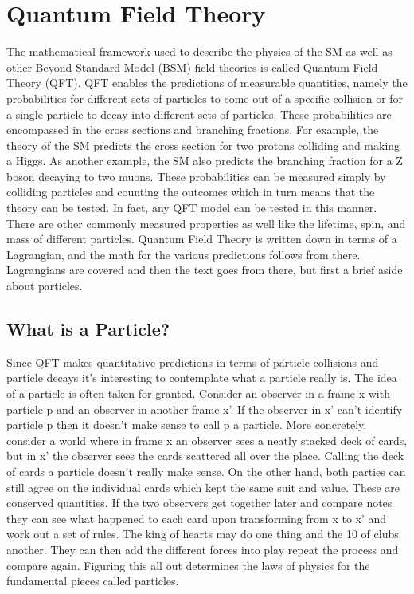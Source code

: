 
\section{Quantum Field Theory}


The mathematical framework used to describe the physics of the SM as well as other Beyond Standard Model (BSM) field theories is called Quantum Field Theory (QFT). QFT enables the predictions of measurable quantities, namely the probabilities for different sets of particles to come out of a specific collision or for a single particle to decay into different sets of particles. These probabilities are encompassed in the cross sections and branching fractions. For example, the theory of the SM predicts the cross section for two protons colliding and making a Higgs. As another example, the SM also predicts the branching fraction for a Z boson decaying to two muons. These probabilities can be measured simply by colliding particles and counting the outcomes which in turn means that the theory can be tested. In fact, any QFT model can be tested in this manner. There are other commonly measured properties as well like the lifetime, spin, and mass of different particles. Quantum Field Theory is written down in terms of a Lagrangian, and the math for the various predictions follows from there. Lagrangians are covered and then the text goes from there, but first a brief aside about particles. 

\subsection{What is a Particle?}

Since QFT makes quantitative predictions in terms of particle collisions and particle decays it's interesting to contemplate what a particle really is. The idea of a particle is often taken for granted. Consider an observer in a frame x with particle p and an observer in another frame x'. If the observer in x' can't identify particle p then it doesn't make sense to call p a particle. More concretely, consider a world where in frame x an observer sees a neatly stacked deck of cards, but in x' the observer sees the cards scattered all over the place. Calling the deck of cards a particle doesn't really make sense. On the other hand, both parties can still agree on the individual cards which kept the same suit and value. These are conserved quantities. If the two observers get together later and compare notes they can see what happened to each card upon transforming from x to x' and work out a set of rules. The king of hearts may do one thing and the 10 of clubs another. They can then add the different forces into play repeat the process and compare again. Figuring this all out determines the laws of physics for the fundamental pieces called particles.       


